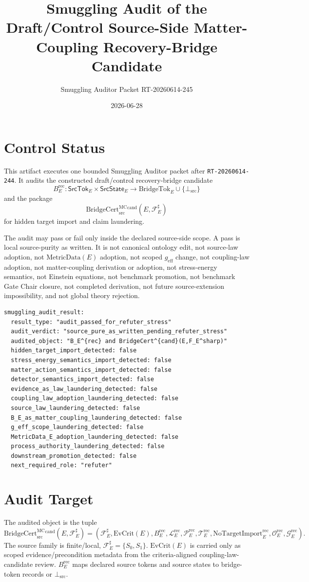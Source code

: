 \documentclass[11pt]{article}
\title{Smuggling Audit of the Draft/Control Source-Side Matter-Coupling Recovery-Bridge Candidate}
\author{Smuggling Auditor Packet RT-20260614-245}
\date{2026-06-28}
\newcommand{\geff}{g_{\mathrm{eff}}}
\newcommand{\MetricData}{\mathrm{MetricData}}
\newcommand{\BridgeCert}{\mathrm{BridgeCert}_{\mathrm{src}}^{\mathrm{MC}}}
\newcommand{\EvCrit}{\mathrm{EvCrit}}
\newcommand{\BottomSrc}{\bot_{\mathrm{src}}}
\newcommand{\BridgeTok}{\mathrm{BridgeTok}}
\newcommand{\NoTargetImport}{\mathrm{NoTargetImport}}
\newcommand{\BErec}{B_E^{\mathrm{rec}}}
\begin{document}
\maketitle

\section{Control Status}

This artifact executes one bounded Smuggling Auditor packet after
\texttt{RT-20260614-244}. It audits the constructed draft/control
recovery-bridge candidate
\[
  \BErec:\mathsf{SrcTok}_E\times\mathsf{SrcState}_E
  \longrightarrow \BridgeTok_E\cup\{\BottomSrc\}
\]
and the package
\[
  \BridgeCert^{\mathrm{cand}}(E,\mathcal{F}_E^\sharp)
\]
for hidden target import and claim laundering.

The audit may pass or fail only inside the declared source-side scope. A pass
is local source-purity as written. It is not canonical ontology edit, not
source-law adoption, not \(\MetricData(E)\) adoption, not scoped \(\geff\)
change, not coupling-law adoption, not matter-coupling derivation or adoption,
not stress-energy semantics, not Einstein equations, not benchmark promotion,
not benchmark Gate Chair closure, not completed derivation, not future
source-extension impossibility, and not global theory rejection.

\begin{verbatim}
smuggling_audit_result:
  result_type: "audit_passed_for_refuter_stress"
  audit_verdict: "source_pure_as_written_pending_refuter_stress"
  audited_object: "B_E^{rec} and BridgeCert^{cand}(E,F_E^sharp)"
  hidden_target_import_detected: false
  stress_energy_semantics_import_detected: false
  matter_action_semantics_import_detected: false
  detector_semantics_import_detected: false
  evidence_as_law_laundering_detected: false
  coupling_law_adoption_laundering_detected: false
  source_law_laundering_detected: false
  B_E_as_matter_coupling_laundering_detected: false
  g_eff_scope_laundering_detected: false
  MetricData_E_adoption_laundering_detected: false
  process_authority_laundering_detected: false
  downstream_promotion_detected: false
  next_required_role: "refuter"
\end{verbatim}

\section{Audit Target}

The audited object is the tuple
\[
  \BridgeCert^{\mathrm{cand}}(E,\mathcal{F}_E^\sharp)
  =
  (\mathcal{F}_E^\sharp,\EvCrit(E),\BErec,
  \mathcal{L}_E^{\mathrm{rec}},\mathcal{P}_E^{\mathrm{rec}},
  \mathcal{T}_E^{\mathrm{rec}},\NoTargetImport_E^{\mathrm{rec}},
  \mathcal{O}_E^{\mathrm{rec}},\mathcal{G}_E^{\mathrm{rec}}).
\]
The source family is finite/local, \(\mathcal{F}_E^\sharp=\{S_0,S_1\}\).
\(\EvCrit(E)\) is carried only as scoped evidence/precondition metadata from
the criteria-aligned coupling-law-candidate review. \(\BErec\) maps declared
source tokens and source states to bridge-token records or \(\BottomSrc\).
\end{document}
